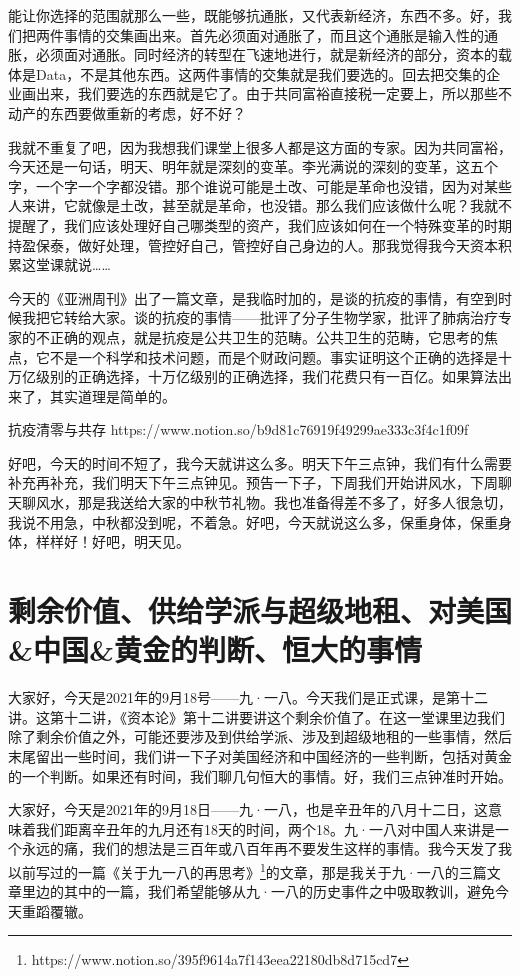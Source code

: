 \documentclass[UTF8, 12pt, a4paper]{ctexrep}
\begin{document}
能让你选择的范围就那么一些，既能够抗通胀，又代表新经济，东西不多。好，我们把两件事情的交集画出来。首先必须面对通胀了，而且这个通胀是输入性的通胀，必须面对通胀。同时经济的转型在飞速地进行，就是新经济的部分，资本的载体是Data，不是其他东西。这两件事情的交集就是我们要选的。回去把交集的企业画出来，我们要选的东西就是它了。由于共同富裕直接税一定要上，所以那些不动产的东西要做重新的考虑，好不好？

我就不重复了吧，因为我想我们课堂上很多人都是这方面的专家。因为共同富裕，今天还是一句话，明天、明年就是深刻的变革。李光满说的深刻的变革，这五个字，一个字一个字都没错。那个谁说可能是土改、可能是革命也没错，因为对某些人来讲，它就像是土改，甚至就是革命，也没错。那么我们应该做什么呢？我就不提醒了，我们应该处理好自己哪类型的资产，我们应该如何在一个特殊变革的时期持盈保泰，做好处理，管控好自己，管控好自己身边的人。那我觉得我今天资本积累这堂课就说……

今天的《亚洲周刊》出了一篇文章，是我临时加的，是谈的抗疫的事情，有空到时候我把它转给大家。谈的抗疫的事情——批评了分子生物学家，批评了肺病治疗专家的不正确的观点，就是抗疫是公共卫生的范畴。公共卫生的范畴，它思考的焦点，它不是一个科学和技术问题，而是个财政问题。事实证明这个正确的选择是十万亿级别的正确选择，十万亿级别的正确选择，我们花费只有一百亿。如果算法出来了，其实道理是简单的。

抗疫清零与共存 https://www.notion.so/b9d81c76919f49299ae333c3f4c1f09f

好吧，今天的时间不短了，我今天就讲这么多。明天下午三点钟，我们有什么需要补充再补充，我们明天下午三点钟见。预告一下子，下周我们开始讲风水，下周聊天聊风水，那是我送给大家的中秋节礼物。我也准备得差不多了，好多人很急切，我说不用急，中秋都没到呢，不着急。好吧，今天就说这么多，保重身体，保重身体，样样好！好吧，明天见。

\section{剩余价值、供给学派与超级地租、对美国\&中国\&黄金的判断、恒大的事情}

大家好，今天是2021年的9月18号——九·一八。今天我们是正式课，是第十二讲。这第十二讲，《资本论》第十二讲要讲这个剩余价值了。在这一堂课里边我们除了剩余价值之外，可能还要涉及到供给学派、涉及到超级地租的一些事情，然后末尾留出一些时间，我们讲一下子对美国经济和中国经济的一些判断，包括对黄金的一个判断。如果还有时间，我们聊几句恒大的事情。好，我们三点钟准时开始。

大家好，今天是2021年的9月18日——九·一八，也是辛丑年的八月十二日，这意味着我们距离辛丑年的九月还有18天的时间，两个18。九·一八对中国人来讲是一个永远的痛，我们的想法是三百年或八百年再不要发生这样的事情。我今天发了我以前写过的一篇《关于九一八的再思考》\footnote{https://www.notion.so/395f9614a7f143eea22180db8d715cd7}的文章，那是我关于九·一八的三篇文章里边的其中的一篇，我们希望能够从九·一八的历史事件之中吸取教训，避免今天重蹈覆辙。
\end{document}
